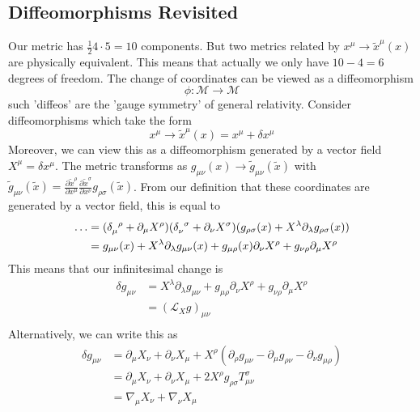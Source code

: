 \subsection{Diffeomorphisms Revisited} 
Our metric has $ \frac{1}{2 } 4 \cdot  5  = 10 $ components. 
But two metrics related by $ x ^ \mu \to \tilde{x } ^ \mu ( x)  $ 
are physically equivalent. 
This means that actually we only have $ 10 - 4  = 6 $ degrees of freedom.
The change of coordinates can be viewed as a diffeomorphism 
\[
 \phi : \mathcal{ M } \to \mathcal{ M }
\] such 'diffeos' are the 'gauge symmetry' of general relativity.
Consider diffeomorphisms which take the form 
\[
	x ^ \mu \to \tilde{ x } ^ \mu ( x) = x ^ \mu + \delta x ^ \mu  
\] Moreover, we can 
view this as a diffeomorphism generated by a vector field 
$ X ^ \mu  = \delta x ^ \mu $. The metric 
transforms as $ g_{ \mu \nu } ( x) \to \tilde{ g } _{ \mu \nu } ( \tilde{ x  })   $
with $ \tilde{ g } _{ \mu \nu } ( \tilde{ x  } )  = \frac{\partial \tilde{ x } ^ \rho  }{\partial x ^ \mu }
\frac{\partial \tilde{ x } ^ \sigma  }{\partial  x ^ \nu }  g _{ \rho \sigma }  ( \tilde{ x  } )  $. 
From our definition that these coordinates are generated by a vector field, 
this is equal to 
\begin{align*}
	\dots &  = ( \delta \indices{ _ \mu ^ \rho } + \partial  _ \mu X ^ \rho ) 
	( \delta \indices{ _ \nu ^ \sigma  } + \partial  _ \nu X ^ \sigma ) 
	( g_{ \rho \sigma } ( x ) + X ^ \lambda \partial  _ \lambda  g_{ \rho \sigma } ( x) ) \\
	      &=  g_{ \mu \nu } ( x) + X ^ \lambda \partial  _ \lambda g _{ \mu \nu } ( x) 
	      + g _{ \mu \rho } ( x ) \partial  _ \nu X ^ \rho + 
	      g _{ \nu \rho } \partial  _ \mu X ^ \rho \\
\end{align*}  
This means that our infinitesimal change is 
\begin{align*}
	\delta g _{ \mu \nu }  & = X ^ \lambda \partial  _ \lambda g _{ \mu \nu } + 
	g _{ \mu \rho } \partial  _ \nu X ^ \rho + g _{ \nu \rho } \partial  _ \mu X ^ \rho \\
			       &= (  \mathcal{ L  } _ X g)_{ \mu \nu }  \\
\end{align*}
Alternatively, we can write this as 
\begin{align*}
	\delta g_{ \mu \nu } &=  \partial  _ \mu X _ \nu + \partial  _ \nu X _ \mu 
	+ X ^ \rho \left(  \partial  _ \rho g _{ \mu \nu } - 
	\partial  _ \mu g _{ \rho \nu } - \partial  _ \nu g _{ \mu \rho }\right) \\
	&=  \partial  _ \mu X _ \nu + \partial  _ \nu X _ \mu + 2 X ^ \rho g _{ \rho \sigma } T ^ \sigma _{ 
	\mu \nu } \\
	&=  \nabla _ \mu X _ \nu + \nabla _ \nu X _ \mu  \\
\end{align*}
